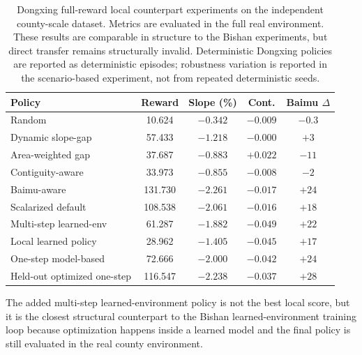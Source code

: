 \documentclass[11pt]{article}
\begin{document}
\begin{table}[htbp]
\centering
\scriptsize
\setlength{\tabcolsep}{3pt}
\caption{Dongxing full-reward local counterpart experiments on the independent county-scale dataset. Metrics are evaluated in the full real environment. These results are comparable in structure to the Bishan experiments, but direct transfer remains structurally invalid. Deterministic Dongxing policies are reported as deterministic episodes; robustness variation is reported in the scenario-based experiment, not from repeated deterministic seeds.}
\label{tab:dongxing_full_counterpart}
\begin{tabular}{lcccc}
\toprule
Policy & Reward & Slope (\%) & Cont. & Baimu $\Delta$ \\
\midrule
Random & 10.624 & $-0.342$ & $-0.009$ & $-0.3$ \\
Dynamic slope-gap & 57.433 & $-1.218$ & $-0.000$ & $+3$ \\
Area-weighted gap & 37.687 & $-0.883$ & $+0.022$ & $-11$ \\
Contiguity-aware & 33.973 & $-0.855$ & $-0.008$ & $-2$ \\
Baimu-aware & 131.730 & $-2.261$ & $-0.017$ & $+24$ \\
Scalarized default & 108.538 & $-2.061$ & $-0.016$ & $+18$ \\
Multi-step learned-env & 61.287 & $-1.882$ & $-0.049$ & $+22$ \\
Local learned policy & 28.962 & $-1.405$ & $-0.045$ & $+17$ \\
One-step model-based & 72.666 & $-2.000$ & $-0.042$ & $+24$ \\
Held-out optimized one-step & 116.547 & $-2.238$ & $-0.037$ & $+28$ \\
\bottomrule
\end{tabular}
\end{table}

The added multi-step learned-environment policy is not the best local score, but it is the closest structural counterpart to the Bishan learned-environment training loop because optimization happens inside a learned model and the final policy is still evaluated in the real county environment.
\end{document}
